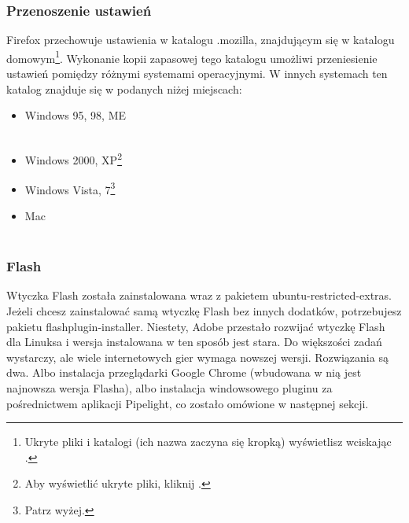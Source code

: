 \subsubsection{Przenoszenie ustawień}
Firefox przechowuje ustawienia w katalogu .mozilla, znajdującym się w katalogu domowym\footnote{Ukryte pliki i katalogi (ich nazwa zaczyna się kropką) wyświetlisz wciskając .}. Wykonanie kopii zapasowej tego katalogu umożliwi przeniesienie ustawień pomiędzy różnymi systemami operacyjnymi. W innych systemach ten katalog znajduje się w podanych niżej miejscach:
\begin{itemize}
\item Windows 95, 98, ME\\
\\
\item Windows 2000, XP\footnote{Aby wyświetlić ukryte pliki, kliknij .}\\
\item Windows Vista, 7\footnote{Patrz wyżej.}\\
\item Mac\\
\\
\end{itemize}

\subsubsection{Flash}
Wtyczka Flash została zainstalowana wraz z pakietem \textcolor{ubuntu_orange}{ubuntu-restricted-extras}. Jeżeli chcesz zainstalować samą wtyczkę Flash bez innych dodatków, potrzebujesz pakietu \textcolor{ubuntu_orange}{flashplugin-installer}. Niestety, Adobe przestało rozwijać wtyczkę Flash dla Linuksa i wersja instalowana w ten sposób jest stara. Do większości zadań wystarczy, ale wiele internetowych gier wymaga nowszej wersji. Rozwiązania są dwa. Albo instalacja przeglądarki Google Chrome (wbudowana w nią jest najnowsza wersja Flasha), albo instalacja windowsowego pluginu za pośrednictwem aplikacji Pipelight, co zostało omówione w następnej sekcji.

